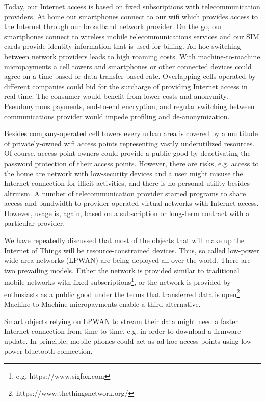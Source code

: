 Today, our Internet access is based on fixed subscriptions with telecommunication providers. At home our smartphones connect to our wifi which provides access to the Internet through our broadband network provider. On the go, our smartphones connect to wireless mobile telecommunications services and our SIM cards provide identity information that is used for billing. Ad-hoc switching between network providers leads to high roaming costs. With machine-to-machine micropayments a cell towers and smartphones or other connected devices could agree on a time-based or data-transfer-based rate. Overlapping cells operated by different companies could bid for the surcharge of providing Internet access in real time. The consumer would benefit from lower costs and anonymity. Pseudonymous payments, end-to-end encryption, and regular switching between communications provider would impede profiling and de-anonymization.

Besides company-operated cell towers every urban area is covered by a multitude of privately-owned wifi access points representing vastly underutilized resources. Of course, access point owners could provide a public good by deactivating the password protection of their access points. However, there are risks, e.g. access to the home are network with low-security devices and a user might misuse the Internet connection for illicit activities, and there is no personal utility besides altruism. A number of telecommunication provider started programs to share access and bandwidth to provider-operated virtual networks with Internet access. However, usage is, again, based on a subscription or long-term contract with a particular provider.

We have repeatedly discussed that most of the objects that will make up the Internet of Things will be resource-constrained devices. Thus, so called low-power wide area networks (LPWAN) are being deployed all over the world. There are two prevailing models. Either the network is provided similar to traditional mobile networks with fixed subscriptions\footnote{e.g. https://www.sigfox.com}, or the network is provided by enthusiasts as a public good under the terms that transferred data is open\footnote{https://www.thethingsnetwork.org/}.
Machine-to-Machine micropayments enable a third alternative.

Smart objects relying on LPWAN to stream their data might need a faster Internet connection from time to time, e.g. in order to download a firmware update. In principle, mobile phones could act as ad-hoc access points using low-power bluetooth connection. 

